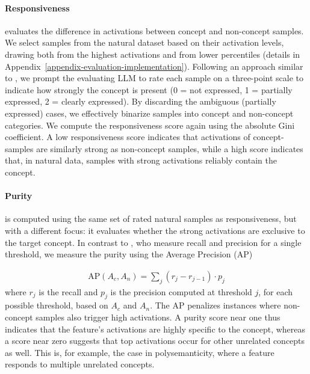 \paragraph{Responsiveness} evaluates the difference in activations between concept and non-concept samples. We select samples from the natural dataset based on their activation levels, drawing both from the highest activations and from lower percentiles (details in Appendix~\ref{appendix-evaluation-implementation}). Following an approach similar to \citet{templeton2024scaling}, we prompt the evaluating LLM to rate each sample on a three-point scale to indicate how strongly the concept is present (0 = not expressed, 1 = partially expressed, 2 = clearly expressed). By discarding the ambiguous (partially expressed) cases, we effectively binarize samples into concept and non-concept categories. We compute the responsiveness score again using the absolute Gini coefficient. A low responsiveness score indicates that activations of concept-samples are similarly strong as non-concept samples, while a high score indicates that, in natural data, samples with strong activations reliably contain the concept.

\paragraph{Purity} is computed using the same set of rated natural samples as responsiveness, but with a different focus: it evaluates whether the strong activations are exclusive to the target concept. In contrast to \cite{huang-etal-2023-rigorously}, who measure recall and precision for a single threshold, we measure the purity using the Average Precision (AP)

{\scriptsize
    \begin{align}
    \mathrm{AP}(A_{c}, A_{n}) = \sum_{j} \left( r_{j} - r_{j-1} \right) \cdot p_{j}
    \end{align}
}
where $r_j$ is the recall and $p_j$ is the precision computed at threshold $j$, for each possible threshold, based on $A_c$ and $A_n$. The AP penalizes instances where non-concept samples also trigger high activations. A purity score near one thus indicates that the feature’s activations are highly specific to the concept, whereas a score near zero suggests that top activations occur for other unrelated concepts as well. This is, for example, the case in polysemanticity, where a feature responds to multiple unrelated concepts. 

